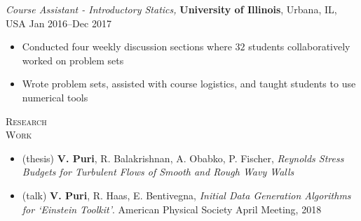 \documentclass[10pt]{article}
\begin{document}
\begin{multicols}{2}
\vspace{0.5em}
%
{\sl Course Assistant - Introductory Statics,} \textbf{University of Illinois}, Urbana, IL, USA \hfill Jan 2016--Dec 2017

\vspace{-1.75em}
\begin{itemize}[label=-]
    \setlength\itemsep{-0.25em}
    \item Conducted four weekly discussion sections where $32$ students collaboratively worked on problem sets
    \item Wrote problem sets, assisted with course logistics, and taught students to use numerical tools
\end{itemize}
\vspace{-2.0em}

\end{multicols}
\vspace{-1.5em}
\begin{multicols}{2}
\textsc{\small Research \\ Work}
\columnbreak

\vspace{-1.75em}
\begin{itemize}[label= ]
    \setlength{\itemindent}{-2.5em}
    \setlength\itemsep{-1.0\itemsep}
    \item (thesis) \textbf{V. Puri}, R. Balakrishnan, A. Obabko, P. Fischer, {\sl Reynolds Stress Budgets for Turbulent Flows of Smooth and Rough Wavy Walls}
    \item (talk) \textbf{V. Puri}, R. Haas, E. Bentivegna, {\sl Initial Data Generation Algorithms for `Einstein Toolkit'}. American Physical Society April Meeting, 2018
\end{itemize}
\vspace{-2.0em}

\end{multicols}
\vspace{-1.5em}
\end{document}
